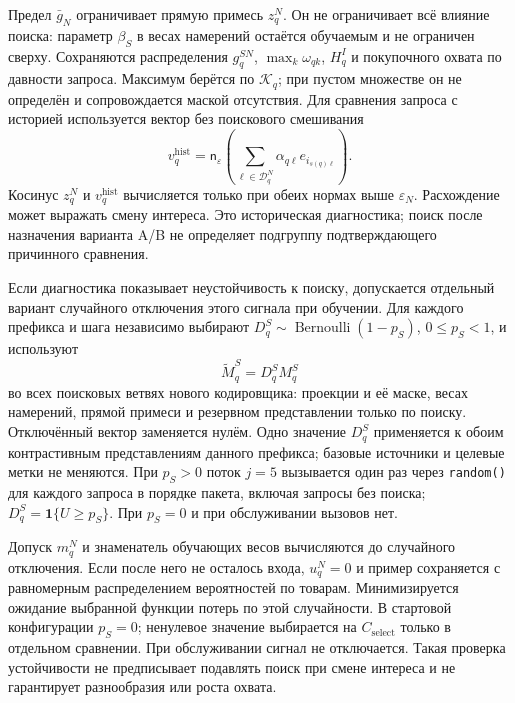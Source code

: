 \documentclass[12pt,a4paper]{article}
\newcommand{\code}[1]{{\ttfamily\small\nolinkurl{#1}}}
\newcommand{\ind}{\mathbf 1}
\newcommand{\eps}{\varepsilon}
\theoremstyle{plainru}
\begin{document}
Предел $\bar g_N$ ограничивает прямую примесь $z_q^N$.
Он не ограничивает всё влияние поиска: параметр $\beta_S$
в весах намерений остаётся обучаемым и не ограничен сверху.
Сохраняются распределения $g_q^{SN}$, $\max_k\omega_{qk}$,
$H_q^I$ и покупочного охвата по давности запроса.
Максимум берётся по $\mathcal K_q$; при пустом множестве
он не определён и сопровождается маской отсутствия.
Для сравнения запроса с историей используется вектор без поискового
смешивания
\begin{equation}\label{eq:modern-history-probe}
v_q^{\mathrm{hist}}=
\mathsf n_\eps\!\left(\sum_{\ell\in\mathcal D_q^N}
\alpha_{q\ell}e_{i_{s(q)\ell}}\right).
\end{equation}
Косинус $z_q^N$ и $v_q^{\mathrm{hist}}$ вычисляется только
при обеих нормах выше $\eps_N$. Расхождение может выражать смену интереса. Это историческая диагностика;
поиск после назначения варианта A/B не определяет подгруппу
подтверждающего причинного сравнения.

Если диагностика показывает неустойчивость к поиску, допускается
отдельный вариант случайного отключения этого сигнала при обучении.
Для каждого префикса и шага независимо выбирают
$D_q^S\sim\operatorname{Bernoulli}(1-p_S)$, $0\le p_S<1$, и используют
\begin{equation}\label{eq:modern-search-dropout}
\widetilde M_q^S=D_q^SM_q^S
\end{equation}
во всех поисковых ветвях нового кодировщика: проекции и её маске,
весах намерений, прямой примеси и резервном представлении только
по поиску. Отключённый вектор заменяется нулём.
Одно значение $D_q^S$ применяется к обоим контрастивным представлениям
данного префикса; базовые источники и целевые метки не меняются.
При $p_S>0$ поток $j=5$ вызывается один раз через \code{random()}
для каждого запроса в порядке пакета, включая запросы без поиска;
$D_q^S=\ind\{U\ge p_S\}$. При $p_S=0$ и при обслуживании вызовов нет.

Допуск $m_q^N$ и знаменатель обучающих весов вычисляются до случайного
отключения. Если после него не осталось входа, $u_q^N=0$ и пример
сохраняется с равномерным распределением вероятностей по товарам.
Минимизируется ожидание выбранной функции потерь по этой случайности.
В стартовой конфигурации $p_S=0$; ненулевое значение выбирается
на $C_{\mathrm{select}}$ только в отдельном сравнении. При обслуживании сигнал не отключается. Такая проверка устойчивости
не предписывает подавлять поиск при смене интереса и не гарантирует
разнообразия или роста охвата.
\end{document}
